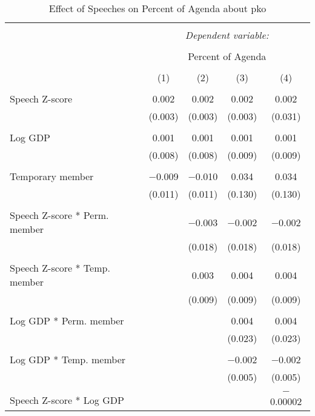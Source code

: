 
\begin{table}[!htbp] \centering 
  \caption{Effect of Speeches on Percent of Agenda about pko} 
  \label{} 
\begin{tabular}{@{\extracolsep{5pt}}lcccc} 
\\[-1.8ex]\hline 
\hline \\[-1.8ex] 
 & \multicolumn{4}{c}{\textit{Dependent variable:}} \\ 
\cline{2-5} 
\\[-1.8ex] & \multicolumn{4}{c}{Percent of Agenda} \\ 
\\[-1.8ex] & (1) & (2) & (3) & (4)\\ 
\hline \\[-1.8ex] 
 Speech Z-score & 0.002 & 0.002 & 0.002 & 0.002 \\ 
  & (0.003) & (0.003) & (0.003) & (0.031) \\ 
  & & & & \\ 
 Log GDP & 0.001 & 0.001 & 0.001 & 0.001 \\ 
  & (0.008) & (0.008) & (0.009) & (0.009) \\ 
  & & & & \\ 
 Temporary member & $-$0.009 & $-$0.010 & 0.034 & 0.034 \\ 
  & (0.011) & (0.011) & (0.130) & (0.130) \\ 
  & & & & \\ 
 Speech Z-score * Perm. member &  & $-$0.003 & $-$0.002 & $-$0.002 \\ 
  &  & (0.018) & (0.018) & (0.018) \\ 
  & & & & \\ 
 Speech Z-score * Temp. member &  & 0.003 & 0.004 & 0.004 \\ 
  &  & (0.009) & (0.009) & (0.009) \\ 
  & & & & \\ 
 Log GDP * Perm. member &  &  & 0.004 & 0.004 \\ 
  &  &  & (0.023) & (0.023) \\ 
  & & & & \\ 
 Log GDP * Temp. member &  &  & $-$0.002 & $-$0.002 \\ 
  &  &  & (0.005) & (0.005) \\ 
  & & & & \\ 
 Speech Z-score * Log GDP &  &  &  & $-$0.00002 \\ 

\end{tabular}
\end{table}
